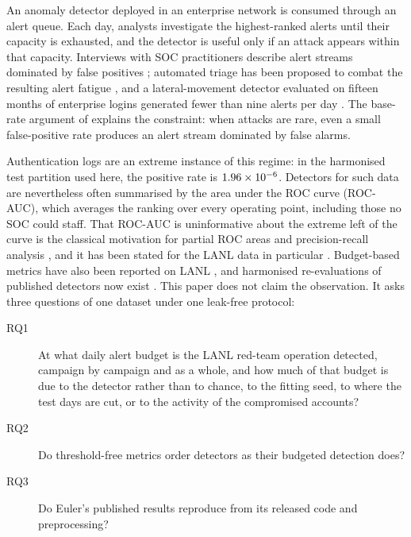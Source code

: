 \documentclass[11pt,a4paper]{article}
\begin{document}
An anomaly detector deployed in an enterprise network is consumed through an alert queue. Each day, analysts investigate the highest-ranked alerts until their capacity is exhausted, and the detector is useful only if an attack appears within that capacity. Interviews with SOC practitioners describe alert streams dominated by false positives \parencite{alahmadi2022}; automated triage has been proposed to combat the resulting alert fatigue \parencite{hassan2019nodoze}, and a lateral-movement detector evaluated on fifteen months of enterprise logins generated fewer than nine alerts per day \parencite{ho2021hopper}. The base-rate argument of \textcite{axelsson2000} explains the constraint: when attacks are rare, even a small false-positive rate produces an alert stream dominated by false alarms.

Authentication logs are an extreme instance of this regime: in the harmonised test partition used here, the positive rate is $1.96 \times 10^{-6}$. Detectors for such data are nevertheless often summarised by the area under the ROC curve (ROC-AUC), which averages the ranking over every operating point, including those no SOC could staff. That ROC-AUC is uninformative about the extreme left of the curve is the classical motivation for partial ROC areas \parencite{mcclish1989} and precision-recall analysis \parencite{davis2006,saito2015}, and it has been stated for the LANL data in particular \parencite{king2022euler}. Budget-based metrics have also been reported on LANL \parencite{larroche2021decades,garchery2020adsage,larroche2025ultralmd}, and harmonised re-evaluations of published detectors now exist \parencite{larroche2026fair,zhao2026gids,wang2025rr}. This paper does not claim the observation. It asks three questions of one dataset under one leak-free protocol:
\begin{description}
\item[RQ1] At what daily alert budget is the LANL red-team operation detected, campaign by campaign and as a whole, and how much of that budget is due to the detector rather than to chance, to the fitting seed, to where the test days are cut, or to the activity of the compromised accounts?
\item[RQ2] Do threshold-free metrics order detectors as their budgeted detection does?
\item[RQ3] Do Euler's published results reproduce from its released code and preprocessing?
\end{description}
\end{document}
